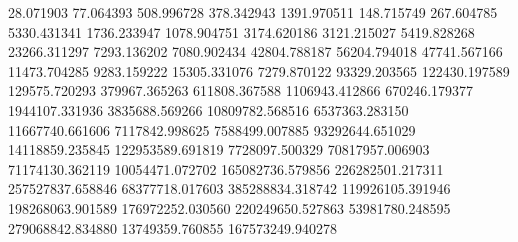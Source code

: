 28.071903
77.064393
508.996728
378.342943
1391.970511
148.715749
267.604785
5330.431341
1736.233947
1078.904751
3174.620186
3121.215027
5419.828268
23266.311297
7293.136202
7080.902434
42804.788187
56204.794018
47741.567166
11473.704285
9283.159222
15305.331076
7279.870122
93329.203565
122430.197589
129575.720293
379967.365263
611808.367588
1106943.412866
670246.179377
1944107.331936
3835688.569266
10809782.568516
6537363.283150
11667740.661606
7117842.998625
7588499.007885
93292644.651029
14118859.235845
122953589.691819
7728097.500329
70817957.006903
71174130.362119
10054471.072702
165082736.579856
226282501.217311
257527837.658846
68377718.017603
385288834.318742
119926105.391946
198268063.901589
176972252.030560
220249650.527863
53981780.248595
279068842.834880
13749359.760855
167573249.940278
